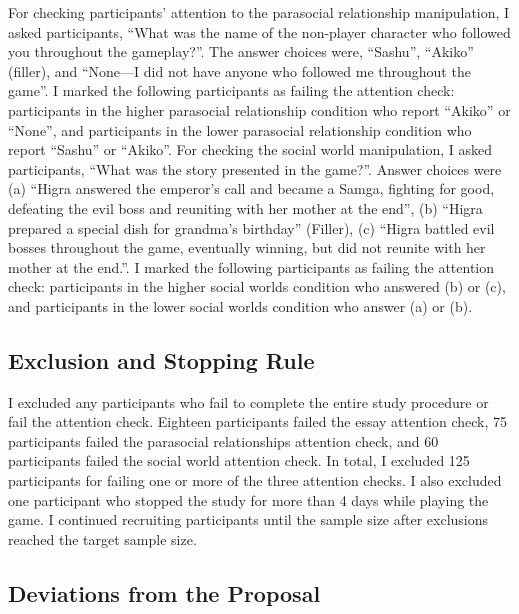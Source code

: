 \documentclass[
]{udthesis}
\begin{document}
For checking participants' attention to the parasocial relationship
manipulation, I asked participants, ``What was the name of the non-player
character who followed you throughout the gameplay?''. The answer choices
were, ``Sashu'', ``Akiko'' (filler), and ``None---I did not have anyone who
followed me throughout the game''. I marked the following participants as
failing the attention check: participants in the higher parasocial
relationship condition who report ``Akiko'' or ``None'', and participants in
the lower parasocial relationship condition who report ``Sashu'' or
``Akiko''. For checking the social world manipulation, I asked
participants, ``What was the story presented in the game?''. Answer
choices were (a) ``Higra answered the emperor's call and became a Samga,
fighting for good, defeating the evil boss and reuniting with her mother
at the end'', (b) ``Higra prepared a special dish for grandma's birthday''
(Filler), (c) ``Higra battled evil bosses throughout the game, eventually
winning, but did not reunite with her mother at the end.''. I marked the
following participants as failing the attention check: participants in
the higher social worlds condition who answered (b) or (c), and
participants in the lower social worlds condition who answer (a) or (b).

\subsection{Exclusion and Stopping Rule}\label{exclusion-and-stopping-rule}

I excluded any participants who fail to complete the entire study
procedure or fail the attention check.
Eighteen participants failed
the essay attention check,
75 participants
failed the parasocial relationships attention check, and
60 participants
failed the social world attention check. In total, I excluded
125 participants for failing one or more of the three
attention checks.
I also excluded one participant
who stopped the study for more than 4 days while playing the game. I
continued recruiting participants until the sample size after exclusions
reached the target sample size.

\subsection{Deviations from the Proposal}\label{deviations-from-the-proposal}
\end{document}

